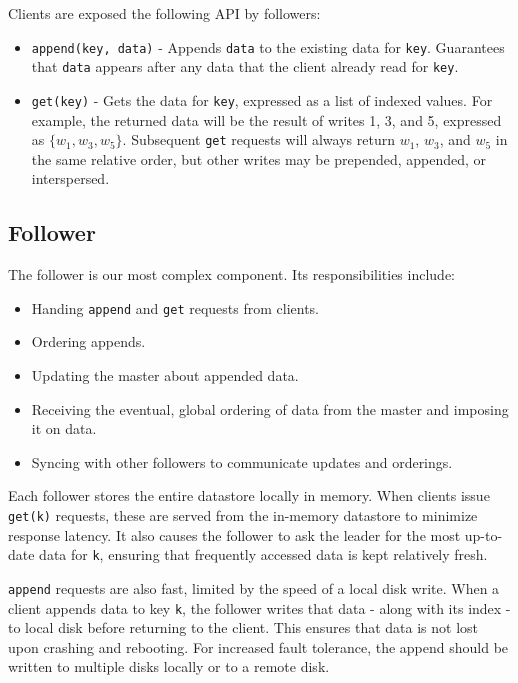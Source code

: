 \documentclass[11pt,english,twocolumn]{article}
\begin{document}
Clients are exposed the following API by followers:
\begin{itemize}
	\item \texttt{append(key, data)} - Appends \texttt{data} to the existing
		data for \texttt{key}. Guarantees that \texttt{data} appears
		after any data that the client already read for \texttt{key}.
	\item \texttt{get(key)} - Gets the data for \texttt{key}, expressed as a
		list of indexed values. For example, the returned data will be
		the result of writes 1, 3, and 5, expressed as $\{w_1, w_3,
		w_5\}$. Subsequent \texttt{get} requests will always return
		$w_1$, $w_3$, and $w_5$ in the same relative order, but other
		writes may be prepended, appended, or interspersed.
\end{itemize}

\subsection{Follower}
The follower is our most complex component. Its responsibilities include:

\begin{itemize}
	\item Handing \texttt{append} and \texttt{get} requests from clients.
	\item Ordering appends.
	\item Updating the master about appended data.
	\item Receiving the eventual, global ordering of data from the master
		and imposing it on data.
	\item Syncing with other followers to communicate updates and orderings.
\end{itemize}

Each follower stores the entire datastore locally in memory. When clients issue
\texttt{get(k)} requests, these are served from the in-memory datastore to minimize
response latency. It also causes the follower to ask the leader for the most
up-to-date data for \texttt{k}, ensuring that frequently accessed data is kept
relatively fresh.

\texttt{append} requests are also fast, limited by the speed of a local disk
write. When a client appends data to key \texttt{k}, the follower writes that
data - along with its index - to local disk before returning to the client. This
ensures that data is not lost upon crashing and rebooting. For increased fault
tolerance, the append should be written to multiple disks locally or to a remote
disk.
\end{document}
